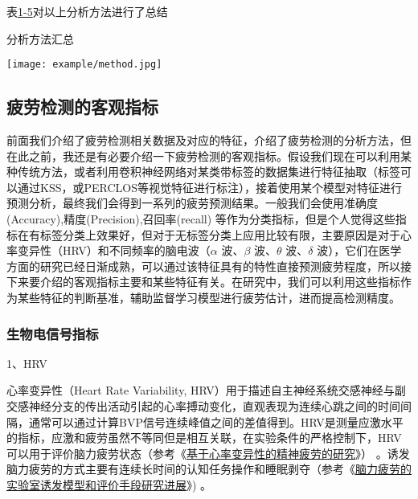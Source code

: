 表\href{table:1-5}{1-5}对以上分析方法进行了总结

\begin{table}[!htp]

\centering
\caption{分析方法汇总}
\texttt{[image: example/method.jpg]}
\label{table:1-5}

\end{table}

\subsection{疲劳检测的客观指标}

前面我们介绍了疲劳检测相关数据及对应的特征，介绍了疲劳检测的分析方法，但在此之前，我还是有必要介绍一下疲劳检测的客观指标。假设我们现在可以利用某种传统方法，或者利用卷积神经网络对某类带标签的数据集进行特征抽取（标签可以通过KSS，或PERCLOS等视觉特征进行标注），接着使用某个模型对特征进行预测分析，最终我们会得到一系列的疲劳预测结果。一般我们会使用准确度(Accuracy),精度(Precision),召回率(recall) 等作为分类指标，但是个人觉得这些指标在有标签分类上效果好，但对于无标签分类上应用比较有限，主要原因是对于心率变异性（HRV）和不同频率的脑电波（$\alpha$ 波、$\beta$ 波、$\theta$ 波、$\delta$ 波），它们在医学方面的研究已经日渐成熟，可以通过该特征具有的特性直接预测疲劳程度，所以接下来要介绍的客观指标主要和某些特征有关。在研究中，我们可以利用这些指标作为某些特征的判断基准，辅助监督学习模型进行疲劳估计，进而提高检测精度。

\subsubsection{生物电信号指标}

1、HRV

心率变异性（Heart Rate Variability, HRV）用于描述自主神经系统交感神经与副交感神经分支的传出活动引起的心率搏动变化，直观表现为连续心跳之间的时间间隔，通常可以通过计算BVP信号连续峰值之间的差值得到。HRV是测量应激水平的指标，应激和疲劳虽然不等同但是相互关联，在实验条件的严格控制下，HRV 可以用于评价脑力疲劳状态（参考《\href{https://xueshu.baidu.com/usercenter/paper/show?paperid=022a05752137ea8cb415ac94f27421d0&site=xueshu_se&hitarticle=1}{基于心率变异性的精神疲劳的研究}》） 。诱发脑力疲劳的方式主要有连续长时间的认知任务操作和睡眠剥夺（参考《\href{https://xueshu.baidu.com/usercenter/paper/show?paperid=8288f753c5b84d6728391325a90bb7ba&site=xueshu_se&hitarticle=1}{脑力疲劳的实验室诱发模型和评价手段研究进展}》) 。

